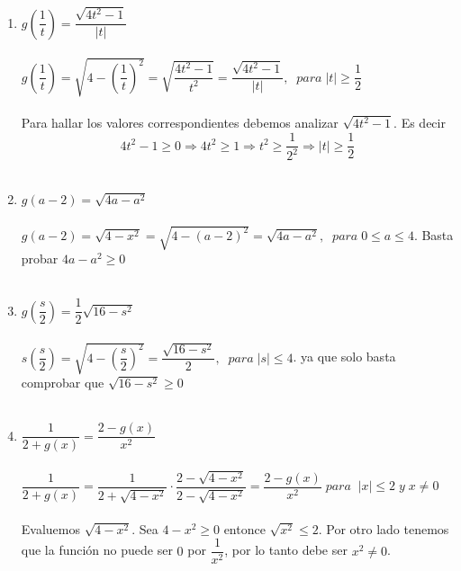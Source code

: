\begin{enumerate}
\begin{enumerate}[\bfseries (a)]
                \item $g\left( \dfrac{1}{t} \right) = \dfrac{\sqrt{4t^2-1}}{|t|}$\\\\
                $g\left( \dfrac{1}{t} \right) = \sqrt{4 - \left( \dfrac{1}{t} \right)^2} = \sqrt{\dfrac{4t^2 - 1}{t^2}} =\dfrac{\sqrt{4t^2 - 1}}{|t|}, \; \; para \; |t| \geq \dfrac{1}{2}$\\\\
                Para hallar los valores correspondientes debemos analizar $\sqrt{4t^2 - 1}$. Es decir $$4t^2-1 \geq 0 \Rightarrow 4t^2 \geq 1 \Rightarrow t^2 \geq \dfrac{1}{2^2} \Rightarrow |t| \geq \dfrac{1}{2}$$\\

                \item $g(a-2) = \sqrt{4a-a^2}$\\\\
                $g(a-2) = \sqrt{4 - x^2} = \sqrt{4 - (a-2)^2} = \sqrt{4a - a^2}, \; \; para \; 0\leq a \leq 4.$ Basta probar  $4a-a^2 \geq 0$\\\\

                \item $g \left( \dfrac{s}{2} \right) = \dfrac{1}{2} \sqrt{16 - s^2}$\\\\
                $s\left( \dfrac{s}{2} \right) = \sqrt{4 - \left( \dfrac{s}{2} \right)^2} = \dfrac{\sqrt{16 - s^2}}{2}, \; \; para \; |s| \leq 4$. ya que solo basta comprobar que $\sqrt{16 - s^2} \geq 0$\\\\

                \item $\dfrac{1}{2 +g(x)} = \dfrac{2-g(x)}{x^2}$\\\\ 
                $\dfrac{1}{2 +g(x)} = \dfrac{1}{2+ \sqrt{4-x^2}} \cdot \dfrac{2 - \sqrt{4-x^2}}{2 - \sqrt{4-x^2}} = \dfrac{2 - g(x)}{x^2}\; para \; \; |x| \leq 2 \; y \; x \neq 0$\\\\ 
                Evaluemos $\sqrt{4-x^2}$. Sea $4-x^2 \geq 0$ entonce $\sqrt{x^2} \leq 2$. Por otro lado tenemos que la función no puede ser $0$ por $\dfrac{1}{x^2}$, por lo tanto debe ser $x^2\neq 0$.\\\\ 
            \end{enumerate}


\end{enumerate}
